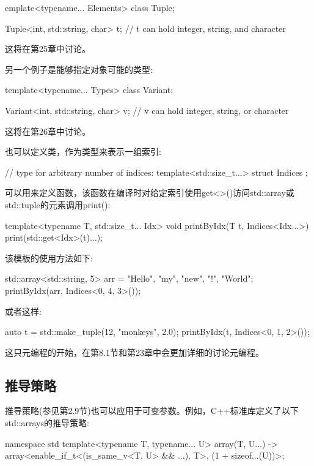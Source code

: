 \begin{cpp}
emplate<typename... Elements>
class Tuple;

Tuple<int, std::string, char> t; // t can hold integer, string, and character
\end{cpp}

这将在第25章中讨论。

另一个例子是能够指定对象可能的类型:

\begin{cpp}
template<typename... Types>
class Variant;

Variant<int, std::string, char> v; // v can hold integer, string, or character
\end{cpp}

这将在第26章中讨论。

也可以定义类，作为类型来表示一组索引:

\begin{cpp}
// type for arbitrary number of indices:
template<std::size_t...>
struct Indices {
};
\end{cpp}

可以用来定义函数，该函数在编译时对给定索引使用get<>()访问std::array或std::tuple的元素调用print():

\begin{cpp}
template<typename T, std::size_t... Idx>
void printByIdx(T t, Indices<Idx...>)
{
	print(std::get<Idx>(t)...);
}
\end{cpp}

该模板的使用方法如下:

\begin{cpp}
std::array<std::string, 5> arr = {"Hello", "my", "new", "!", "World"};
printByIdx(arr, Indices<0, 4, 3>());
\end{cpp}

或者这样:

\begin{cpp}
auto t = std::make_tuple(12, "monkeys", 2.0);
printByIdx(t, Indices<0, 1, 2>());
\end{cpp}

这只元编程的开始，在第8.1节和第23章中会更加详细的讨论元编程。

\subsection{推导策略}

推导策略(参见第2.9节)也可以应用于可变参数。例如，C++标准库定义了以下std::arrays的推导策略:

\begin{cpp}
namespace std {
	template<typename T, typename... U> array(T, U...)
	-> array<enable_if_t<(is_same_v<T, U> && ...), T>,
		(1 + sizeof...(U))>;
}
\end{cpp}

